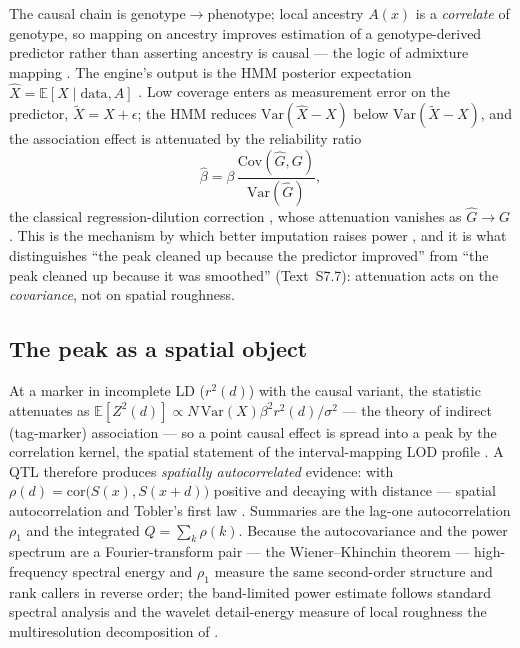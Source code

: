 \documentclass[11pt]{article}
\begin{document}
The causal chain is genotype$\rightarrow$phenotype; local ancestry $A(x)$ is a
\emph{correlate} of genotype, so mapping on ancestry improves estimation of a
genotype-derived predictor rather than asserting ancestry is causal --- the logic of
admixture mapping \citep{mckeigue_1998,patterson_2004,winkler_2010}. The engine's
output is the HMM posterior expectation $\hat X=\mathbb{E}[X\mid\text{data},A]$
\citep{rabiner_1989,falush_2003}. Low coverage enters as measurement error on the
predictor, $\tilde X = X+\epsilon$; the HMM reduces $\mathrm{Var}(\hat X - X)$ below
$\mathrm{Var}(\tilde X - X)$, and the association effect is attenuated by the
reliability ratio
\begin{equation}
\hat\beta = \beta\,\frac{\mathrm{Cov}(\hat G,G)}{\mathrm{Var}(\hat G)},
\label{eq:attenuation}
\end{equation}
the classical regression-dilution correction \citep{frost_thompson_2000}, whose
attenuation vanishes as $\hat G\to G$. This is the mechanism by which better
imputation raises power \citep{marchini_howie_2010,mach_2010,beagle_2007,stitch_2016,glimpse_2021},
and it is what distinguishes ``the peak cleaned up because the predictor improved''
from ``the peak cleaned up because it was smoothed'' (Text~S7.7): attenuation acts on
the \emph{covariance}, not on spatial roughness.

\subsection{The peak as a spatial object}
\label{sec:spatial}

At a marker in incomplete LD ($r^2(d)$) with the causal variant, the statistic
attenuates as $\mathbb{E}[Z^2(d)]\propto N\,\mathrm{Var}(X)\beta^2 r^2(d)/\sigma^2$
--- the theory of indirect (tag-marker) association \citep{pritchard_2001} --- so a
point causal effect is spread into a peak by the correlation kernel, the spatial
statement of the interval-mapping LOD profile \citep{lander_botstein_1989}. A QTL
therefore produces \emph{spatially autocorrelated} evidence: with
$\rho(d)=\mathrm{cor}\big(S(x),S(x+d)\big)$ positive and decaying with distance ---
spatial autocorrelation \citep{moran_1950,geary_1954} and Tobler's first law
\citep{tobler_1970}. Summaries are the lag-one autocorrelation $\rho_1$ and the
integrated $Q=\sum_k\rho(k)$. Because the autocovariance and the power spectrum are a
Fourier-transform pair --- the Wiener--Khinchin theorem \citep{wiener_1930,khinchin_1934}
--- high-frequency spectral energy and $\rho_1$ measure the same second-order
structure and rank callers in reverse order; the band-limited power estimate follows
standard spectral analysis \citep{percival_walden_1993} and the wavelet detail-energy
measure of local roughness the multiresolution decomposition of \citet{mallat_1989}.
\end{document}
